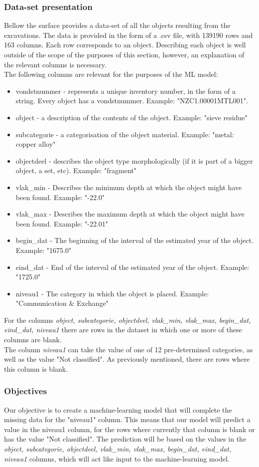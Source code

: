 \subsubsection{Data-set presentation}
Bellow the surface provides a data-set\cite{DatasetBelow} of all the objects resulting from the excavations. The data is provided in the form of a .csv file, with 139190 rows and 163 columns. Each row corresponds to an object. Describing each object is well outside of the scope of the purposes of this section, however, an explanation of the relevant columns is necessary. \\
The following columns are relevant for the purposes of the ML model: 
\begin{itemize}
    \item vondstnummer - represents a unique inventory number, in the form of a string. Every object has a vondstnummer. Example: "NZC1.00001MTL001".
    \item  object -  a description of the contents of the object. Example: "sieve residue"
    \item  subcategorie - a categorisation of the object material. Example: "metal: copper alloy"
    \item objectdeel - describes the object type morphologically (if it is part of a bigger object, a set, etc). Example: "fragment"
    \item vlak\_min - Describes the minimum depth at which the object might have been found. Example: "-22.0"
    \item vlak\_max - Describes the maximum depth at which the object might have been found. Example: "-22.01"
    \item begin\_dat - The beginning of the interval of the estimated year of the object. Example: "1675.0"
    \item eind\_dat - End of the interval of the estimated year of the object. Example: "1725.0"
    \item niveau1 - The category in which the object is placed. Example:  "Communication \& Exchange"
\end{itemize}
For the columns \textit{object, subcategorie, objectdeel, vlak\_min, vlak\_max, begin\_dat, eind\_dat,  niveau1} there are rows in the dataset in which one or more of these columns are blank.  \\
The column \textit{niveau1} can take the value of one of 12 pre-determined categories, as well as the value "Not classified". As previously mentioned, there are rows where this column is blank. 
\subsubsection{Objectives}
Our objective is to create a machine-learning model that will complete the missing data for the "niveau1" column. This means that our model will predict a value in the niveau1 column, for the rows where currently that column is blank or has the value "Not classified". The prediction will be based on the values in the \textit{object, subcategorie, objectdeel, vlak\_min, vlak\_max, begin\_dat, eind\_dat,  niveau1} columns, which will act like input to the machine-learning model. 

